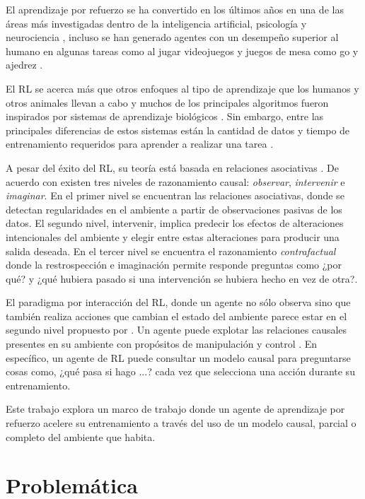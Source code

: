 El aprendizaje por refuerzo se ha convertido en los últimos años en una de las áreas
más investigadas dentro de la inteligencia artificial, psicología y neurociencia \cite{botvinick2019reinforcement}, incluso
se han generado agentes con
un desempeño superior al humano en algunas tareas como  al jugar videojuegos \cite{mnih2015human}\cite{starcraft2019deepmind} y juegos de mesa como go y ajedrez \cite{Silver1140}.

El RL se acerca más que otros enfoques al tipo de aprendizaje que los humanos y otros
animales llevan a cabo y muchos de los principales algoritmos fueron inspirados por 
sistemas de aprendizaje biológicos \cite{sutton_barto_2018}. Sin embargo,
entre las principales diferencias de estos sistemas 
están la cantidad de datos y tiempo de entrenamiento
requeridos para aprender a realizar una tarea \cite{Silver1140}.

A pesar del éxito del RL, su teoría está basada 
en relaciones asociativas \cite{playingagainstnature2018}.
De acuerdo con \cite{pearl2018bookofwhy} existen tres niveles
de razonamiento causal: \textit{observar}, \textit{intervenir}
e \textit{imaginar}.
En el primer nivel se encuentran las 
relaciones asociativas, donde se detectan regularidades
en el ambiente a partir de observaciones pasivas de los datos.
El segundo nivel, intervenir, implica predecir los 
efectos de alteraciones intencionales del ambiente
y elegir entre estas alteraciones  para producir una
salida deseada. En el tercer nivel se encuentra
el razonamiento \textit{contrafactual} donde la restrospección
e imaginación permite responde preguntas como ¿por qué?
y ¿qué hubiera pasado si una intervención se hubiera hecho 
en vez de otra?.


El paradigma por interacción del RL, donde un agente
no sólo observa sino que también realiza acciones que 
cambian el estado del ambiente parece estar 
en el segundo nivel propuesto por \cite{pearl2018bookofwhy}.
Un agente puede explotar las relaciones causales presentes
en su ambiente con propósitos de manipulación y control \cite{woodward2005making}.
En específico, un agente de RL puede consultar un modelo
causal para preguntarse cosas como, ¿qué pasa si hago ...?
cada vez que selecciona una acción durante su entrenamiento.

Este trabajo explora un marco de trabajo donde un agente
de aprendizaje por refuerzo acelere su entrenamiento a través
del uso de un modelo causal, parcial o completo del ambiente
que habita. 


\section{Problemática}

